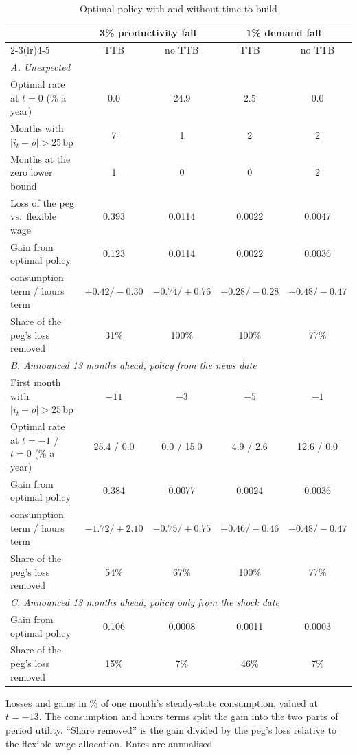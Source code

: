 \documentclass[11pt]{article}
\theoremstyle{definition}
\begin{document}
\begin{table}[t]
  \centering
  \caption{Optimal policy with and without time to build}\label{tab:policy}
  \small\setlength{\tabcolsep}{3.5pt}
  \begin{tabular}{lcccc}
    \toprule
    & \multicolumn{2}{c}{3\% productivity fall} & \multicolumn{2}{c}{1\% demand fall} \\
    \cmidrule(lr){2-3}\cmidrule(lr){4-5}
    & TTB & no TTB & TTB & no TTB \\
    \midrule
    \multicolumn{5}{l}{\emph{A. Unexpected}}\\
    Optimal rate at $t=0$ (\% a year)        & 0.0 & 24.9 & 2.5 & 0.0 \\
    Months with $|i_t-\rho|>25$\,bp          & 7    & 1    & 2    & 2 \\
    Months at the zero lower bound           & 1    & 0    & 0    & 2 \\
    Loss of the peg vs.\ flexible wage        & 0.393 & 0.0114 & 0.0022 & 0.0047 \\
    Gain from optimal policy                 & 0.123 & 0.0114 & 0.0022 & 0.0036 \\
    \quad consumption term / hours term      & $+0.42/-0.30$ & $-0.74/+0.76$ & $+0.28/-0.28$ & $+0.48/-0.47$ \\
    Share of the peg's loss removed          & 31\% & 100\% & 100\% & 77\% \\
    \midrule
    \multicolumn{5}{l}{\emph{B. Announced 13 months ahead, policy from the news date}}\\
    First month with $|i_t-\rho|>25$\,bp     & $-11$ & $-3$ & $-5$ & $-1$ \\
    Optimal rate at $t=-1$ / $t=0$ (\% a year) & 25.4 / 0.0 & 0.0 / 15.0 & 4.9 / 2.6 & 12.6 / 0.0 \\
    Gain from optimal policy                 & 0.384 & 0.0077 & 0.0024 & 0.0036 \\
    \quad consumption term / hours term      & $-1.72/+2.10$ & $-0.75/+0.75$ & $+0.46/-0.46$ & $+0.48/-0.47$ \\
    Share of the peg's loss removed          & 54\% & 67\% & 100\% & 77\% \\
    \midrule
    \multicolumn{5}{l}{\emph{C. Announced 13 months ahead, policy only from the shock date}}\\
    Gain from optimal policy                 & 0.106 & 0.0008 & 0.0011 & 0.0003 \\
    Share of the peg's loss removed          & 15\% & 7\% & 46\% & 7\% \\
    \bottomrule
  \end{tabular}

  \medskip
  \parbox{0.95\textwidth}{\footnotesize Losses and gains in \% of one month's steady-state
  consumption, valued at $t=-13$. The consumption and hours terms split the gain into the two
  parts of period utility. ``Share removed'' is the gain divided by the peg's loss relative to the
  flexible-wage allocation. Rates are annualised.}
\end{table}
\end{document}
